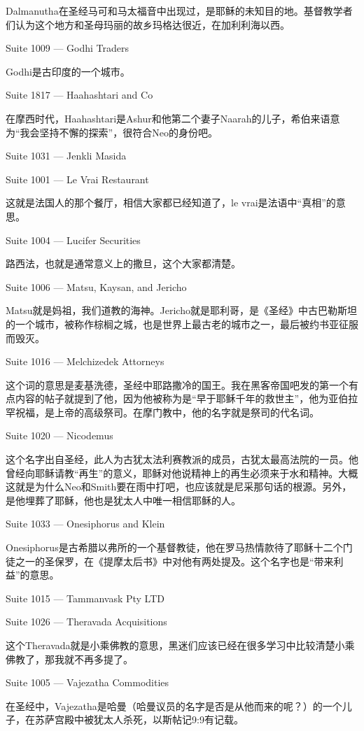 \documentclass[UTF8]{ctexart}
\begin{document}
Dalmanutha在圣经马可和马太福音中出现过，是耶稣的未知目的地。基督教学者们认为这个地方和圣母玛丽的故乡玛格达很近，在加利利海以西。

Suite 1009 --- Godhi Traders

Godhi是古印度的一个城市。

Suite 1817 --- Haahashtari and Co

在摩西时代，Haahashtari是Ashur和他第二个妻子Naarah的儿子，希伯来语意为“我会坚持不懈的探索”，很符合Neo的身份吧。

Suite 1031 --- Jenkli Masida

Suite 1001 --- Le Vrai Restaurant

这就是法国人的那个餐厅，相信大家都已经知道了，le vrai是法语中“真相”的意思。

Suite 1004 --- Lucifer Securities

路西法，也就是通常意义上的撒旦，这个大家都清楚。

Suite 1006 --- Matsu, Kaysan, and Jericho

Matsu就是妈祖，我们道教的海神。Jericho就是耶利哥，是《圣经》中古巴勒斯坦的一个城市，被称作棕榈之城，也是世界上最古老的城市之一，最后被约书亚征服而毁灭。

Suite 1016 --- Melchizedek Attorneys

这个词的意思是麦基洗德，圣经中耶路撒冷的国王。我在黑客帝国吧发的第一个有点内容的帖子就提到了他，因为他被称为是“早于耶稣千年的救世主”，他为亚伯拉罕祝福，是上帝的高级祭司。在摩门教中，他的名字就是祭司的代名词。

Suite 1020 --- Nicodemus

这个名字出自圣经，此人为古犹太法利赛教派的成员，古犹太最高法院的一员。他曾经向耶稣请教“再生”的意义，耶稣对他说精神上的再生必须来于水和精神。大概这就是为什么Neo和Smith要在雨中打吧，也应该就是尼采那句话的根源。另外，是他埋葬了耶稣，他也是犹太人中唯一相信耶稣的人。

Suite 1033 --- Onesiphorus and Klein

Onesiphorus是古希腊以弗所的一个基督教徒，他在罗马热情款待了耶稣十二个门徒之一的圣保罗，在《提摩太后书》中对他有两处提及。这个名字也是“带来利益”的意思。

Suite 1015 --- Tammanvask Pty LTD

Suite 1026 --- Theravada Acquisitions

这个Theravada就是小乘佛教的意思，黑迷们应该已经在很多学习中比较清楚小乘佛教了，那我就不再多提了。

Suite 1005 --- Vajezatha Commodities

在圣经中，Vajezatha是哈曼（哈曼议员的名字是否是从他而来的呢？）的一个儿子，在苏萨宫殿中被犹太人杀死，以斯帖记9:9有记载。
\end{document}
